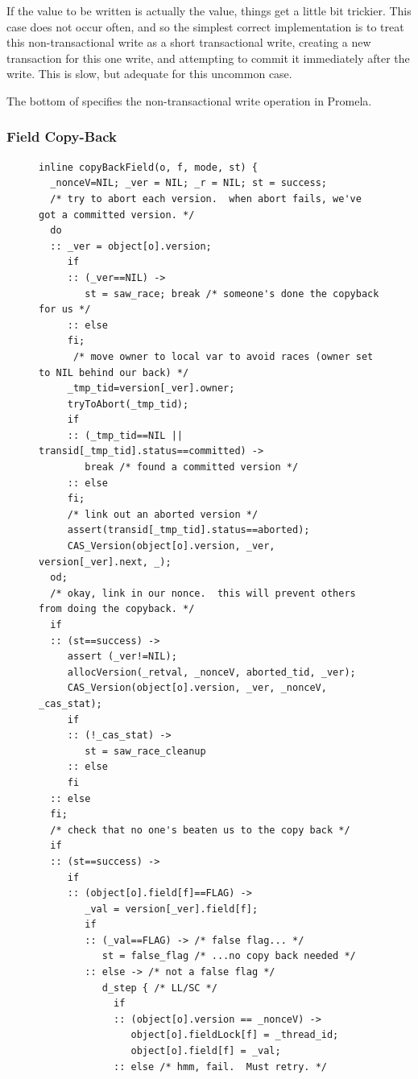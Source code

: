If the value to be written is actually the \FLAG value, things get a
little bit trickier.  This case does not occur often, and so the
simplest correct implementation is to treat this non-transactional
write as a short transactional write, creating a new transaction for
this one write, and attempting to commit it immediately after the
write.  This is slow, but adequate for this uncommon case.

The bottom of  specifies the non-transactional
write operation in Promela.

\subsubsection{Field Copy-Back}\label{sec:copyback}
\begin{figure}\sis\fontsize{6.5}{7.4}
\begin{verbatim}
inline copyBackField(o, f, mode, st) {
  _nonceV=NIL; _ver = NIL; _r = NIL; st = success;
  /* try to abort each version.  when abort fails, we've got a committed version. */
  do
  :: _ver = object[o].version;
     if
     :: (_ver==NIL) ->
        st = saw_race; break /* someone's done the copyback for us */
     :: else
     fi;
      /* move owner to local var to avoid races (owner set to NIL behind our back) */
     _tmp_tid=version[_ver].owner;
     tryToAbort(_tmp_tid);
     if
     :: (_tmp_tid==NIL || transid[_tmp_tid].status==committed) ->
        break /* found a committed version */
     :: else
     fi;
     /* link out an aborted version */
     assert(transid[_tmp_tid].status==aborted);
     CAS_Version(object[o].version, _ver, version[_ver].next, _);
  od;
  /* okay, link in our nonce.  this will prevent others from doing the copyback. */
  if
  :: (st==success) ->
     assert (_ver!=NIL);
     allocVersion(_retval, _nonceV, aborted_tid, _ver);
     CAS_Version(object[o].version, _ver, _nonceV, _cas_stat);
     if
     :: (!_cas_stat) ->
        st = saw_race_cleanup
     :: else
     fi
  :: else
  fi;
  /* check that no one's beaten us to the copy back */
  if
  :: (st==success) ->
     if
     :: (object[o].field[f]==FLAG) ->
        _val = version[_ver].field[f];
        if
        :: (_val==FLAG) -> /* false flag... */
           st = false_flag /* ...no copy back needed */
        :: else -> /* not a false flag */
           d_step { /* LL/SC */
             if
             :: (object[o].version == _nonceV) ->
                object[o].fieldLock[f] = _thread_id;
                object[o].field[f] = _val;
             :: else /* hmm, fail.  Must retry. */

\end{verbatim}
\end{figure}

